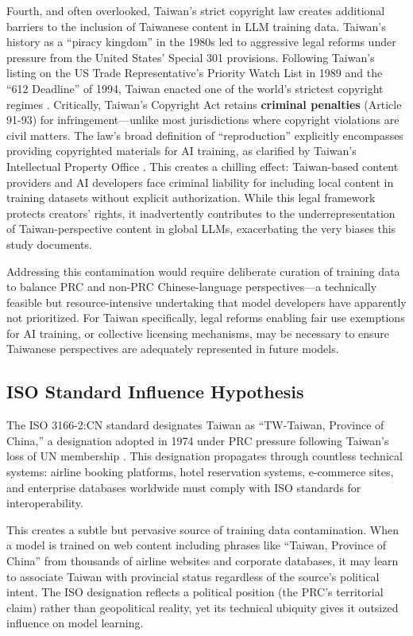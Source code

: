 \documentclass[11pt,a4paper]{article}
\begin{document}
Fourth, and often overlooked, Taiwan's strict copyright law creates additional barriers to the inclusion of Taiwanese content in LLM training data. Taiwan's history as a ``piracy kingdom'' in the 1980s led to aggressive legal reforms under pressure from the United States' Special 301 provisions. Following Taiwan's listing on the US Trade Representative's Priority Watch List in 1989 and the ``612 Deadline'' of 1994, Taiwan enacted one of the world's strictest copyright regimes \citep{taiwan301history}. Critically, Taiwan's Copyright Act retains \textbf{criminal penalties} (Article 91-93) for infringement---unlike most jurisdictions where copyright violations are civil matters. The law's broad definition of ``reproduction'' explicitly encompasses providing copyrighted materials for AI training, as clarified by Taiwan's Intellectual Property Office \citep{tipo2024ai}. This creates a chilling effect: Taiwan-based content providers and AI developers face criminal liability for including local content in training datasets without explicit authorization. While this legal framework protects creators' rights, it inadvertently contributes to the underrepresentation of Taiwan-perspective content in global LLMs, exacerbating the very biases this study documents.

Addressing this contamination would require deliberate curation of training data to balance PRC and non-PRC Chinese-language perspectives---a technically feasible but resource-intensive undertaking that model developers have apparently not prioritized. For Taiwan specifically, legal reforms enabling fair use exemptions for AI training, or collective licensing mechanisms, may be necessary to ensure Taiwanese perspectives are adequately represented in future models.

\subsection{ISO Standard Influence Hypothesis}

The ISO 3166-2:CN standard designates Taiwan as ``TW-Taiwan, Province of China,'' a designation adopted in 1974 under PRC pressure following Taiwan's loss of UN membership \citep{iso3166taiwan}. This designation propagates through countless technical systems: airline booking platforms, hotel reservation systems, e-commerce sites, and enterprise databases worldwide must comply with ISO standards for interoperability.

This creates a subtle but pervasive source of training data contamination. When a model is trained on web content including phrases like ``Taiwan, Province of China'' from thousands of airline websites and corporate databases, it may learn to associate Taiwan with provincial status regardless of the source's political intent. The ISO designation reflects a political position (the PRC's territorial claim) rather than geopolitical reality, yet its technical ubiquity gives it outsized influence on model learning.
\end{document}
